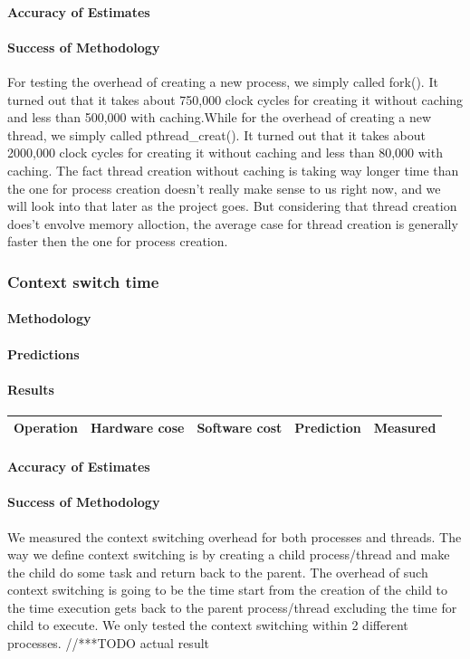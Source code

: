 \paragraph{Accuracy of Estimates}
\paragraph{Success of Methodology}
For testing the overhead of creating a new process, we simply called fork(). It turned out that it takes about 750,000 clock cycles for creating it without caching and less than 500,000 with caching.While for the overhead of creating a new thread, we simply called pthread\_creat(). It turned out that it takes about 2000,000 clock cycles for creating it without caching and less than 80,000 with caching.
The fact thread creation without caching is taking way longer time than the one for process creation doesn't really make sense to us right now, and we will look into that later as the project goes. But considering that thread creation does't envolve memory alloction, the average case for thread creation is generally faster then the one for process creation.


\subsubsection{Context switch time}
\paragraph{Methodology}
\paragraph{Predictions}
\paragraph{Results}

\begin{tabular}{| l | l | l | l | l |}
\hline
Operation & Hardware cose & Software cost & Prediction & Measured \\
\hline
\end{tabular}
\paragraph{Accuracy of Estimates}
\paragraph{Success of Methodology}
We measured the context switching overhead for both processes and threads. The way we define context switching is by creating a child process/thread and make the child do some task and return back to the parent. The overhead of such context switching is going to be the time start from the creation of the child to the time execution gets back to the parent process/thread excluding the time for child to execute. We only tested the context switching within 2 different processes.
//***TODO actual result

